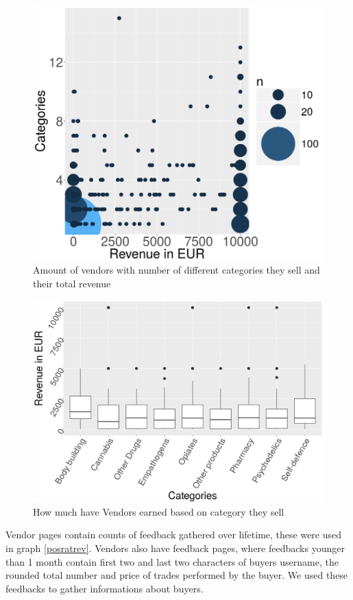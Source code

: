 \documentclass[
  digital, %
  table,   %
  lof,     %
  lot,     %
  oneside
]{fithesis3}
\begin{document}
\begin{figure}[!htb]
    \centering
    \includegraphics[scale=0.4]{catxrev}
    \caption{Amount of vendors with number of different categories they sell and their total revenue}
    \label{catxrev}
\end{figure}

\begin{figure}[!htb]
    \centering
    \includegraphics[scale=0.4]{boxcat}
    \caption{How much have Vendors earned based on category they sell}
    \label{boxcat}
\end{figure}


Vendor pages contain counts of feedback gathered over lifetime, these were used
in graph \ref{posratrev}. Vendors also have feedback pages, where feedbacks younger than
1 month contain first two and last two characters of buyers username,
the rounded total number and price of trades performed by the buyer.
We used these feedbacks to gather informations about buyers.
\end{document}
